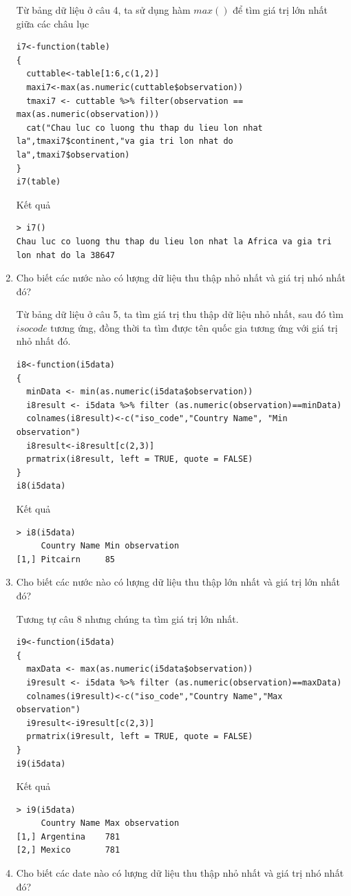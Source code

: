 \documentclass[a4paper]{article}
\theoremstyle{definition}
\begin{document}
\begin{enumerate}[1)]
Từ bảng dữ liệu ở câu 4, ta sử dụng hàm $max()$ để tìm giá trị lớn nhất giữa các châu lục
\begin{lstlisting}
i7<-function(table)
{
  cuttable<-table[1:6,c(1,2)]
  maxi7<-max(as.numeric(cuttable$observation))
  tmaxi7 <- cuttable %>% filter(observation == max(as.numeric(observation)))
  cat("Chau luc co luong thu thap du lieu lon nhat la",tmaxi7$continent,"va gia tri lon nhat do la",tmaxi7$observation)
}
i7(table)
\end{lstlisting}
Kết quả
\begin{lstlisting}
> i7()
Chau luc co luong thu thap du lieu lon nhat la Africa va gia tri lon nhat do la 38647
\end{lstlisting}
\item  Cho biết các nước nào có lượng dữ liệu thu thập nhỏ nhất và giá trị nhó nhất đó? 

Từ bảng dữ liệu ở câu 5, ta tìm giá trị thu thập dữ liệu nhỏ nhất, sau đó tìm $isocode$ tương ứng, đồng thời ta tìm được tên quốc gia tương ứng với giá trị nhỏ nhất đó.
\begin{lstlisting}
i8<-function(i5data)
{
  minData <- min(as.numeric(i5data$observation))
  i8result <- i5data %>% filter (as.numeric(observation)==minData)
  colnames(i8result)<-c("iso_code","Country Name", "Min observation")
  i8result<-i8result[c(2,3)]
  prmatrix(i8result, left = TRUE, quote = FALSE)
}
i8(i5data)
\end{lstlisting}
Kết quả
\begin{lstlisting}
> i8(i5data)
     Country Name Min observation
[1,] Pitcairn     85     
\end{lstlisting}
\item Cho biết các nước nào có lượng dữ liệu thu thập lớn nhất và giá trị lớn nhất đó? 

Tương tự câu 8 nhưng chúng ta tìm giá trị lớn nhất.
\begin{lstlisting}
i9<-function(i5data)
{
  maxData <- max(as.numeric(i5data$observation))
  i9result <- i5data %>% filter (as.numeric(observation)==maxData)
  colnames(i9result)<-c("iso_code","Country Name","Max observation")
  i9result<-i9result[c(2,3)]
  prmatrix(i9result, left = TRUE, quote = FALSE)
}
i9(i5data)
\end{lstlisting}
Kết quả
\begin{lstlisting}
> i9(i5data)
     Country Name Max observation
[1,] Argentina    781            
[2,] Mexico       781    
\end{lstlisting}

\item Cho biết các date nào có lượng dữ liệu thu thập nhỏ nhất và giá trị nhó nhất đó? 


\end{enumerate}
\end{document}
